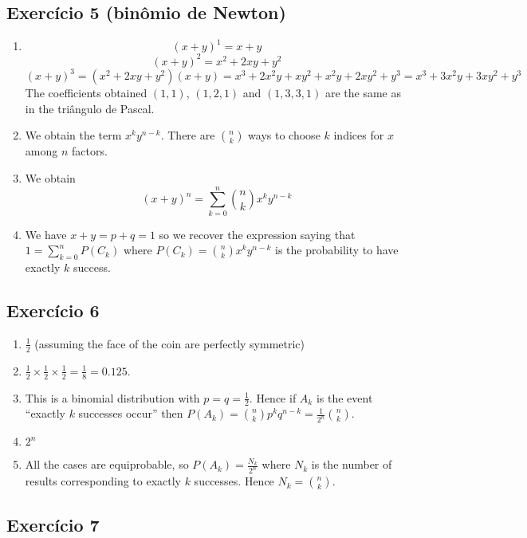 \subsection*{Exercício 5 (binômio de Newton)}

\begin{enumerate}
\item $${(x+y)}^1 = x + y$$
  $${(x+y)}^2 = x^2 + 2xy + y^2$$
  $${(x+y)}^3 = {(x^2 + 2xy + y^2)}{(x+y)} =
  x^3 + 2x^2y + xy^2 + x^2y + 2xy^2 + y^3 =
  x^3 + 3x^2y + 3xy^2 + y^3$$
The coefficients obtained $(1, 1)$, $(1, 2, 1)$ and $(1, 3, 3, 1)$ are the same
as in the triângulo de Pascal.

\item We obtain the term $x^k y^{n-k}$. There are $\binom{n}{k}$ ways to choose
  $k$ indices for $x$ among $n$ factors.

\item We obtain
  $${(x+y)}^n = \sum_{k=0}^n \binom{n}{k} x^k y^{n-k}$$

\item We have $x+y=p+q=1$ so we recover the expression saying that
  $1 = \sum_{k=0}^n P(C_k)$ where
  $P(C_k) = \binom{n}{k} x^k y^{n-k}$ is the probability to have exactly
  $k$ success.
\end{enumerate}

\subsection*{Exercício 6}

\begin{enumerate}
\item $\frac{1}{2}$ (assuming the face of the coin are perfectly symmetric)
\item $\frac{1}{2} \times \frac{1}{2} \times \frac{1}{2} = \frac{1}{8} = 0.125$.
\item This is a binomial distribution with $p=q=\frac{1}{2}$.
  Hence if $A_k$ is the event ``exactly $k$ successes occur'' then
  $P(A_k) = \binom{n}{k} p^k q^{n-k} = \frac{1}{2^n} \binom{n}{k}$.
\item $2^n$
\item All the cases are equiprobable, so
  $P(A_k) = \frac{N_k}{2^n}$ where $N_k$ is the number of results corresponding
  to exactly $k$ successes. Hence $N_k = \binom{n}{k}$.
\end{enumerate}

\subsection*{Exercício 7}

